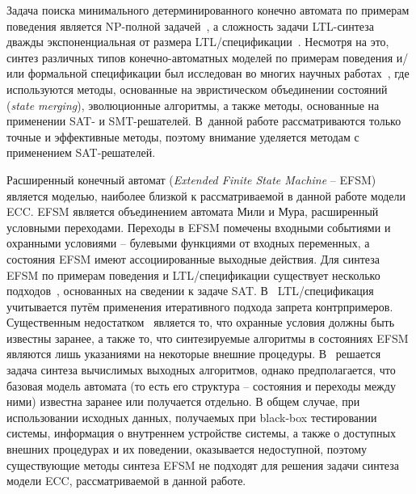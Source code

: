 
Задача поиска минимального детерминированного конечно автомата по примерам поведения является NP-полной задачей~\cite{gold}, а сложность задачи LTL-синтеза дважды экспоненциальная от размера LTL\-/спецификации~\cite{rosner-phd}.
Несмотря на это, синтез различных типов конечно-автоматных моделей по примерам поведения и/или формальной спецификации был исследован во многих научных работах~\cite{heule2010,efsm-tools,zakirzyanov2019,buzhinsky-tii,bosy,tsarev-egorov-gecco,giantamidis-tripakis,petrenko,petrenko2,neider,g4ltl-st,smetsers-lata}, где используются методы, основанные на эвристическом объединении состояний (\textit{state merging}), эволюционные алгоритмы, а также методы, основанные на применении SAT- и SMT-решателей.
В~данной работе рассматриваются только точные и эффективные методы, поэтому внимание уделяется методам с применением SAT-решателей.

Расширенный конечный автомат (\textit{Extended Finite State Machine} \--- EFSM) является моделью, наиболее близкой к рассматриваемой в данной работе модели ECC\@. EFSM является объединением автомата Мили и Мура, расширенный условными переходами. Переходы в EFSM помечены входными событиями и охранными условиями \--- булевыми функциями от входных переменных, а состояния EFSM имеют ассоциированные выходные действия.
Для синтеза EFSM по примерам поведения и LTL\-/спецификации существует несколько подходов~\cite{efsm-tools,walkinshaw}, основанных на сведении к задаче SAT. В~\cite{efsm-tools} LTL\-/спецификация учитывается путём применения итеративного подхода запрета контрпримеров.
Существенным недостатком~\cite{efsm-tools} является то, что охранные условия должны быть известны заранее, а также то, что синтезируемые алгоритмы в состояниях EFSM являются лишь указаниями на некоторые внешние процедуры.
В~\cite{walkinshaw} решается задача синтеза вычислимых выходных алгоритмов, однако предполагается, что базовая модель автомата (то есть его структура \--- состояния и переходы между ними) известна заранее или получается отдельно.
В общем случае, при использовании исходных данных, получаемых при black-box тестировании системы, информация о внутреннем устройстве системы, а также о доступных внешних процедурах и их поведении, оказывается недоступной, поэтому существующие методы синтеза EFSM не подходят для решения задачи синтеза модели ECC, рассматриваемой в данной работе.

